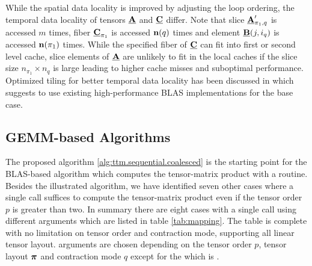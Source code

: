 While the spatial data locality is improved by adjusting the loop ordering, the temporal data locality of tensors $\underline{\mathbf{A}}$ and $\underline{\mathbf{C}}$ differ.
Note that slice $\underline{\mathbf{A}}_{\pi_1,q}'$ is accessed $m$ times, fiber $\underline{\mathbf{C}}_{\pi_1}$ is accessed $\mathbf{n}(q)$ times and element $\underline{\mathbf{B}}(j,i_q)$ is accessed $\mathbf{n}(\pi_1)$ times.
While the specified fiber of $\underline{\mathbf{C}}$ can fit into first or second level cache, slice elements of $\underline{\mathbf{A}}$ are unlikely to fit in the local caches if the slice size $n_{\pi_1} \times n_q$ is large leading to higher cache misses and suboptimal performance.
Optimized tiling for better temporal data locality has been discussed in \cite{goto:2008:gemm} which suggests to use existing high-performance BLAS implementations for the base case.

\subsection{GEMM-based Algorithms}
\label{sec:design:blas.based.algorithm}
The proposed algorithm \ref{alg:ttm.sequential.coalesced} is the starting point for the BLAS-based algorithm which computes the tensor-matrix product with a  routine.
Besides the illustrated algorithm, we have identified seven other cases where a single  call suffices to compute the tensor-matrix product even if the tensor order $p$ is greater than two.
In summary there are eight cases with a single  call using different arguments which are listed in table \ref{tab:mapping}.
The table is complete with no limitation on tensor order and contraction mode, supporting all linear tensor layout.
 arguments are chosen depending on the tensor order $p$, tensor layout $\boldsymbol{\pi}$ and contraction mode $q$ except for the  which is .

